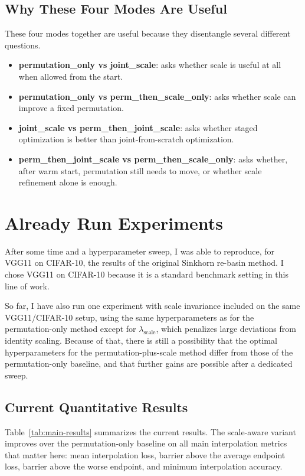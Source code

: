 \documentclass[11pt,a4paper]{article}
\begin{document}
\subsection{Why These Four Modes Are Useful}

These four modes together are useful because they disentangle several different questions.

\begin{itemize}
    \item \textbf{permutation\_only vs joint\_scale}: asks whether scale is useful at all when allowed from the start.
    \item \textbf{permutation\_only vs perm\_then\_scale\_only}: asks whether scale can improve a fixed permutation.
    \item \textbf{joint\_scale vs perm\_then\_joint\_scale}: asks whether staged optimization is better than joint-from-scratch optimization.
    \item \textbf{perm\_then\_joint\_scale vs perm\_then\_scale\_only}: asks whether, after warm start, permutation still needs to move, or whether scale refinement alone is enough.
\end{itemize}

\section{Already Run Experiments}

After some time and a hyperparameter sweep, I was able to reproduce, for VGG11 on CIFAR-10, the results of the original Sinkhorn re-basin method. I chose VGG11 on CIFAR-10 because it is a standard benchmark setting in this line of work.

So far, I have also run one experiment with scale invariance included on the same VGG11/CIFAR-10 setup, using the same hyperparameters as for the permutation-only method except for \(\lambda_{\mathrm{scale}}\), which penalizes large deviations from identity scaling. Because of that, there is still a possibility that the optimal hyperparameters for the permutation-plus-scale method differ from those of the permutation-only baseline, and that further gains are possible after a dedicated sweep.

\subsection{Current Quantitative Results}

Table~\ref{tab:main-results} summarizes the current results. The scale-aware variant improves over the permutation-only baseline on all main interpolation metrics that matter here: mean interpolation loss, barrier above the average endpoint loss, barrier above the worse endpoint, and minimum interpolation accuracy.
\end{document}
